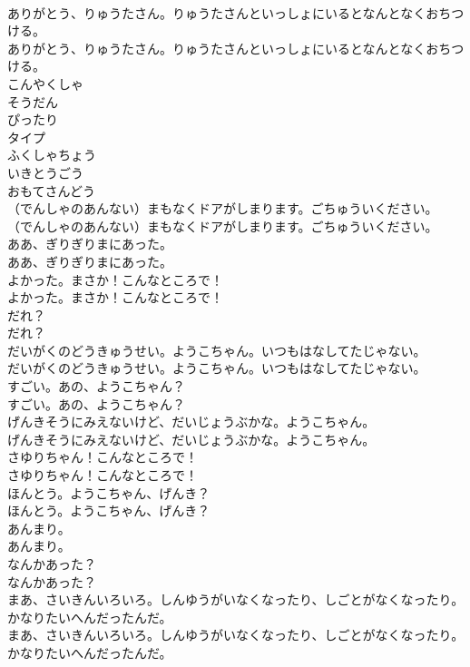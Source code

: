\documentclass[8pt]{extreport}
\begin{document}
\begin{CJK}{UTF8}{min}
\\	ありがとう、りゅうたさん。りゅうたさんといっしょにいるとなんとなくおちつける。
\\	ありがとう、りゅうたさん。りゅうたさんといっしょにいるとなんとなくおちつける。
\\	こんやくしゃ
\\	そうだん
\\	ぴったり
\\	タイプ
\\	ふくしゃちょう
\\	いきとうごう
\\	おもてさんどう
\\	（でんしゃのあんない）まもなくドアがしまります。ごちゅういください。
\\	（でんしゃのあんない）まもなくドアがしまります。ごちゅういください。
\\	ああ、ぎりぎりまにあった。
\\	ああ、ぎりぎりまにあった。
\\	よかった。まさか！こんなところで！
\\	よかった。まさか！こんなところで！
\\	だれ？
\\	だれ？
\\	だいがくのどうきゅうせい。ようこちゃん。いつもはなしてたじゃない。
\\	だいがくのどうきゅうせい。ようこちゃん。いつもはなしてたじゃない。
\\	すごい。あの、ようこちゃん？
\\	すごい。あの、ようこちゃん？
\\	げんきそうにみえないけど、だいじょうぶかな。ようこちゃん。
\\	げんきそうにみえないけど、だいじょうぶかな。ようこちゃん。
\\	さゆりちゃん！こんなところで！
\\	さゆりちゃん！こんなところで！
\\	ほんとう。ようこちゃん、げんき？
\\	ほんとう。ようこちゃん、げんき？
\\	あんまり。
\\	あんまり。
\\	なんかあった？
\\	なんかあった？
\\	まあ、さいきんいろいろ。しんゆうがいなくなったり、しごとがなくなったり。かなりたいへんだったんだ。
\\	まあ、さいきんいろいろ。しんゆうがいなくなったり、しごとがなくなったり。かなりたいへんだったんだ。

\end{CJK}
\end{document}
